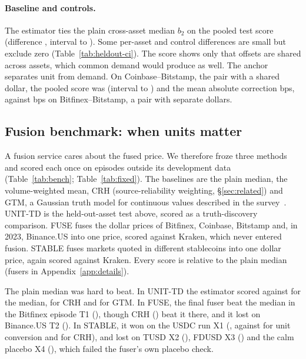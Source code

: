 \documentclass[sigconf,review,anonymous]{acmart}
\begin{document}
\paragraph{Baseline and controls.} The estimator ties the plain cross-asset median $b_2$ on the pooled test score
(difference \NumPTestPooledDiff{}, interval \NumPTestPooledDiffLo{} to \NumPTestPooledDiffHi{}). Some per-asset and control
differences are small but exclude zero (Table~\ref{tab:heldout-ci}). The score shows only that offsets are shared across assets, which common demand would produce as well. The anchor separates
unit from demand. On Coinbase--Bitstamp, the pair with a shared dollar, the pooled score was
\NumPCtrlCbBstPooledEst{} (interval \NumPCtrlCbBstPooledEstLo{} to \NumPCtrlCbBstPooledEstHi{}) and the mean absolute
correction \NumPCtrlCbBstPooledAbsEst{} bps, against \NumPCtrlBfxBstPooledAbsEst{} bps on Bitfinex--Bitstamp, a pair with
separate dollars.

\subsection{Fusion benchmark: when units matter}
\label{sec:bench}

A fusion service cares about the fused price. We therefore froze three methods and scored each once on episodes outside its
development data (Table~\ref{tab:bench}; Table~\ref{tab:fixed}).
The baselines are the plain median, the volume-weighted mean, CRH (source-reliability weighting, \S\ref{sec:related}) and
GTM, a Gaussian truth model for continuous values described in the survey~\cite{li2015survey}. UNIT-TD is the held-out-asset test above, scored as a truth-discovery comparison. FUSE fuses
the dollar prices of Bitfinex, Coinbase, Bitstamp and, in 2023, Binance.US into one price, scored against Kraken, which
never entered fusion. STABLE fuses markets quoted in different stablecoins into one dollar price, again scored against
Kraken. Every score is relative to the plain median (fusers in Appendix~\ref{app:details}).

The plain median was hard to beat. In UNIT-TD the estimator scored \NumBTdTestScore{} against \NumBTdBTwo{} for the median,
\NumBTdCrh{} for CRH and \NumBTdGtm{} for GTM. In FUSE, the final fuser beat the median in the Bitfinex episode T1
(\NumBFuseTOneFuser{}), though CRH (\NumBFuseTOneCrh{}) beat it there, and it lost on Binance.US T2 (\NumBFuseTTwoFuser{}). In STABLE, it won on the USDC run X1
(\NumBStableXOneFuser{}, against \NumBStableXOneBTwo{} for unit conversion and \NumBStableXOneBThree{} for CRH), and lost on TUSD X2 (\NumBStableXTwoFuser{}), FDUSD X3 (\NumBStableXThreeFuser{}) and the calm
placebo X4 (\NumBStableXFourFuser{}), which failed the fuser's own placebo check.
\end{document}
